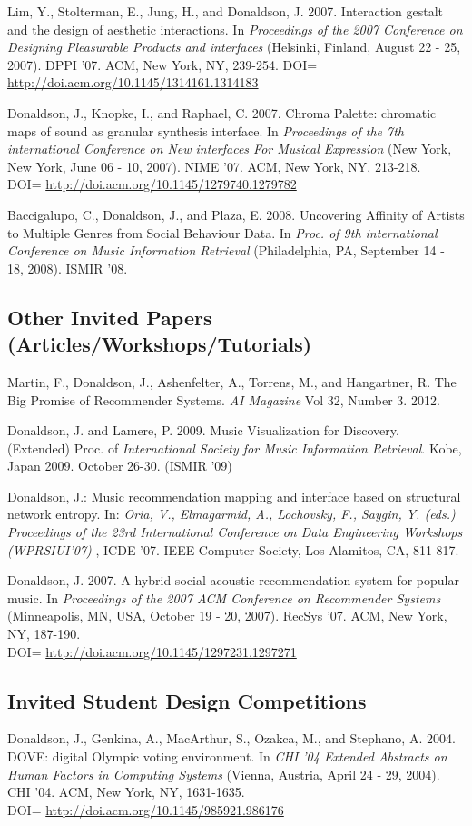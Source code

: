 \documentclass[overlapped,line,letterpaper]{res}
\begin{document}
\begin{resume}
Lim, Y., Stolterman, E., Jung, H., and Donaldson, J. 2007. Interaction gestalt and the design of aesthetic interactions. In \emph{Proceedings of the 2007 Conference on Designing Pleasurable Products and interfaces} (Helsinki, Finland, August 22 - 25, 2007). DPPI '07. ACM, New York, NY, 239-254.
DOI= \url{http://doi.acm.org/10.1145/1314161.1314183}

Donaldson, J., Knopke, I., and Raphael, C. 2007. Chroma Palette: chromatic maps of sound as granular synthesis interface. In \emph{Proceedings of the 7th international Conference on New interfaces For Musical Expression} (New York, New York, June 06 - 10, 2007). NIME '07. ACM, New York, NY, 213-218. \\DOI= \url{http://doi.acm.org/10.1145/1279740.1279782}

Baccigalupo, C., Donaldson, J., and Plaza, E. 2008. Uncovering Affinity of Artists to Multiple Genres from Social Behaviour Data.  In \emph{Proc. of 9th international Conference on Music Information Retrieval} (Philadelphia, PA, September 14 - 18, 2008). ISMIR '08.


\subsection{\bf Other Invited Papers (Articles/Workshops/Tutorials)}
Martin, F., Donaldson, J., Ashenfelter, A., Torrens, M., and Hangartner, R. The Big Promise of Recommender Systems. \emph{AI Magazine} Vol 32, Number 3. 2012.

Donaldson, J. and Lamere, P. 2009. Music Visualization for Discovery.  (Extended) Proc. of \emph{International Society for Music Information Retrieval}. Kobe, Japan 2009. October 26-30. (ISMIR '09)

Donaldson, J.: Music recommendation mapping and interface based on structural network entropy. In: \emph{Oria, V., Elmagarmid, A., Lochovsky, F., Saygin, Y. (eds.) Proceedings of the 23rd International Conference on Data Engineering Workshops (WPRSIUI'07) }, ICDE '07. IEEE Computer Society, Los Alamitos, CA, 811-817.

Donaldson, J. 2007. A hybrid social-acoustic recommendation system for popular music. In \emph{Proceedings of the 2007 ACM Conference on Recommender Systems} (Minneapolis, MN, USA, October 19 - 20, 2007). RecSys '07. ACM, New York, NY, 187-190.\\DOI= \url{http://doi.acm.org/10.1145/1297231.1297271}


\subsection{\bf Invited Student Design Competitions}
Donaldson, J., Genkina, A., MacArthur, S., Ozakca, M., and Stephano, A. 2004. DOVE: digital Olympic voting environment. In \emph{CHI '04 Extended Abstracts on Human Factors in Computing Systems} (Vienna, Austria, April 24 - 29, 2004). CHI '04. ACM, New York, NY, 1631-1635. \\DOI= \url{http://doi.acm.org/10.1145/985921.986176}


\end{resume}
\end{document}

